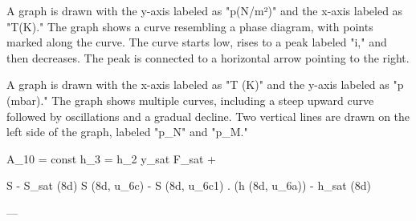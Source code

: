 A graph is drawn with the y-axis labeled as "p(N/m²)" and the x-axis labeled as "T(K)." The graph shows a curve resembling a phase diagram, with points marked along the curve. The curve starts low, rises to a peak labeled "i," and then decreases. The peak is connected to a horizontal arrow pointing to the right.

A graph is drawn with the x-axis labeled as "T (K)" and the y-axis labeled as "p (mbar)." The graph shows multiple curves, including a steep upward curve followed by oscillations and a gradual decline. Two vertical lines are drawn on the left side of the graph, labeled "p_N" and "p_M."

A_10 = const  
h_3 = h_2  
y_sat  
F_sat +  

S - S_sat (8d)  
S (8d, u_6c) - S (8d, u_6c1)  
. (h (8d, u_6a)) - h_sat (8d)  

---